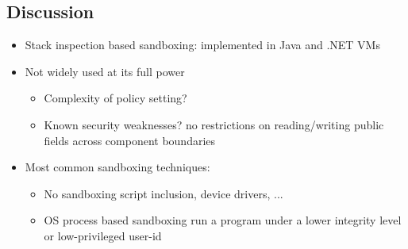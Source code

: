 \documentclass[12pt,titlepage,a4paper]{report}
\begin{document}
			\subsection{Discussion}
			\begin{itemize}
				\item Stack inspection based sandboxing: implemented in Java and .NET VMs
				\item Not widely used at its full power
				\begin{itemize}
					\item Complexity of policy setting?
					\item Known security weaknesses?
						\subitem no restrictions on reading/writing public fields across component boundaries
				\end{itemize}
				\item Most common sandboxing techniques:
				\begin{itemize}
					\item No sandboxing
						\subitem script inclusion, device drivers, ...
					\item OS process based sandboxing
						\subitem run a program under a lower integrity level or low-privileged user-id
				\end{itemize}
			\end{itemize}
\end{document}
